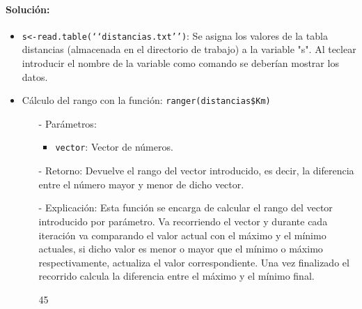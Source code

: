 \documentclass[a4paper, 12pt]{article}
\begin{document}
	\paragraph{Solución:}
	\begin{itemize}
		\item \texttt{s<-read.table(‘‘distancias.txt’’)}: Se asigna los valores de la tabla distancias (almacenada en el directorio de trabajo) a la variable "s". Al teclear introducir el nombre de la variable como comando se deberían mostrar los datos.
		
		\item Cálculo del rango con la función: \texttt{ranger(distancias\$Km)}
		\begin{itemize}
			\item[-] Parámetros:
			\begin{itemize}
				\item \texttt{vector}: Vector de números.
			\end{itemize}
			
			\item[-]  Retorno: Devuelve el rango del vector introducido, es decir, la diferencia entre el número mayor y menor de dicho vector.
			
			\item[-] Explicación: Esta función se encarga de calcular el rango del vector introducido por parámetro. Va recorriendo el vector y durante cada iteración va comparando el valor actual con el máximo y el mínimo actuales, si dicho valor es menor o mayor que el mínimo o máximo respectivamente, actualiza el valor correspondiente. Una vez finalizado el recorrido calcula la diferencia entre el máximo y el mínimo final.
\begin{Schunk}
\begin{Soutput}
[1] 45
\end{Soutput}
\end{Schunk}
		\end{itemize} 
		

\end{itemize}
\end{document}
